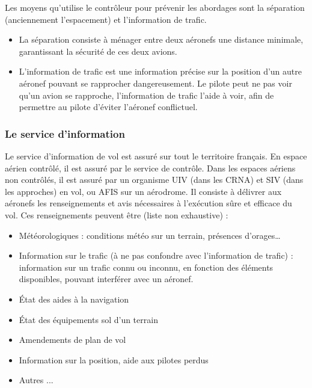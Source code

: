 Les moyens qu'utilise le contrôleur pour prévenir les abordages sont la séparation (anciennement l'espacement) et l'information de trafic.
\begin{itemize}
    \item La séparation consiste à ménager entre deux aéronefs une distance minimale, garantissant la sécurité de ces deux avions.
    \item L'information de trafic est une information précise sur la position d'un autre aéronef pouvant se rapprocher dangereusement. Le pilote peut ne pas voir qu'un avion se rapproche, l'information de trafic l'aide à voir, afin de permettre au pilote d'éviter l'aéronef conflictuel.
\end{itemize}\medskip

        \subsubsection{Le service d'information}
Le service d'information de vol est assuré sur tout le territoire français. En espace aérien contrôlé, il est assuré par le service de contrôle. Dans les espaces aériens non contrôlés, il est assuré par un organisme UIV (dans les CRNA) et SIV (dans les approches) en vol, ou AFIS sur un aérodrome.
Il consiste à délivrer aux aéronefs les renseignements et avis nécessaires à l'exécution sûre et efficace du vol. Ces renseignements peuvent être (liste non exhaustive) :
\begin{itemize}
\item Météorologiques : conditions météo sur un terrain, présences d'orages…
\item Information sur le trafic (à ne pas confondre avec l'information de trafic) : information sur un trafic connu ou inconnu, en fonction des éléments disponibles, pouvant interférer avec un aéronef.
\item État des aides à la navigation
\item État des équipements sol d'un terrain
\item Amendements de plan de vol
\item Information sur la position, aide aux pilotes perdus
\item Autres ...
\end{itemize}\medskip

